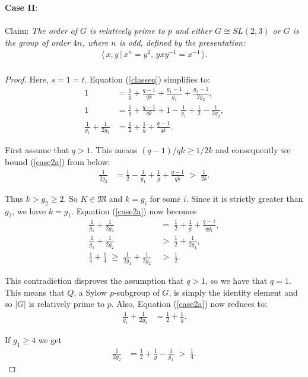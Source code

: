 \textbf{Case II}:\\
\\
Claim: \textit{The order of $G$ is relatively prime to $p$ and either $G \cong SL(2,3)$ or $G$ is the group of order $4n$, where $n$ is odd, defined by the presentation:}
\begin{align*} \langle \, x,y \, | \, x^n = y^2, \, yxy^{-1} = x^{-1} \, \rangle. \\
\end{align*}
\begin{proof} Here, $s = 1 = t$. Equation (\ref{classeq}) simplifies to:
\begin{align}\label{case2a} 1 &= \frac{1}{g} + \frac{q-1}{qk} + \frac{g_1-1}{g_1} +  \frac{g_2-1}{2g_2}, \nonumber
\\ 1 &= \frac{1}{g} + \frac{q-1}{qk} + 1 - \frac{1}{g_1} + \frac{1}{2} - \frac{1}{2g_2}, \nonumber
\\ \frac{1}{g_1}  + \frac{1}{2g_2} &= \frac{1}{2} + \frac{1}{g} + \frac{q-1}{qk}.
\end{align}

First assume that $q>1$. This means $(q-1)/qk \geq 1/2k$ and consequently we bound (\ref{case2a}) from below:
\begin{align*} \frac{1}{2g_2} &= \frac{1}{2} - \frac{1}{g_1} + \frac{1}{g} + \frac{q-1}{qk} \; > \; \frac{1}{2k}.
\end{align*}

Thus $k > g_2 \geq 2$. So $K \in \mathfrak{M}$ and $k=g_i$ for some $i$. Since it is strictly greater than $g_2$, we have $k=g_1$. Equation (\ref{case2a}) now becomes
\begin{align*} \frac{1}{g_1}  + \frac{1}{2g_2} \; &= \; \frac{1}{2} + \frac{1}{g} + \frac{q-1}{qg_1},
\\ \frac{1}{g_1}  + \frac{1}{2g_2} \; &> \; \frac{1}{2} + \frac{1}{2g_1},
\\ \frac{1}{4} + \frac{1}{4} \; \geq \; \frac{1}{2g_1}  + \frac{1}{2g_2} \; &> \; \frac{1}{2}.
\end{align*}

This contradiction disproves the assumption that $q > 1$, so we have that $q = 1$. This means that $Q$, a Sylow $p$-subgroup of $G$, is simply the identity element and so $|G|$ is relatively prime to $p$. Also, Equation (\ref{case2a}) now reduces to:
\begin{align}\label{case2b} \frac{1}{g_1}  + \frac{1}{2g_2} &= \frac{1}{2} + \frac{1}{g}.
\end{align}

If $g_1 \geq 4$ we get
\begin{align*} \frac{1}{2g_2} &= \frac{1}{2} + \frac{1}{g} - \frac{1}{g_1} \; > \; \frac{1}{4}.
\end{align*}


\end{proof}
